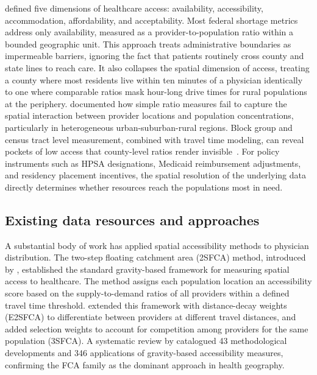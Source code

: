 \documentclass{CUP-JNL-DAP}%
\begin{document}
\citet{penchansky1981} defined five dimensions of healthcare access: availability, accessibility, accommodation, affordability, and acceptability. Most federal shortage metrics address only availability, measured as a provider-to-population ratio within a bounded geographic unit. This approach treats administrative boundaries as impermeable barriers, ignoring the fact that patients routinely cross county and state lines to reach care. It also collapses the spatial dimension of access, treating a county where most residents live within ten minutes of a physician identically to one where comparable ratios mask hour-long drive times for rural populations at the periphery. \citet{guagliardo2004} documented how simple ratio measures fail to capture the spatial interaction between provider locations and population concentrations, particularly in heterogeneous urban-suburban-rural regions. Block group and census tract level measurement, combined with travel time modeling, can reveal pockets of low access that county-level ratios render invisible~\citep{xia2019}. For policy instruments such as HPSA designations, Medicaid reimbursement adjustments, and residency placement incentives, the spatial resolution of the underlying data directly determines whether resources reach the populations most in need.

\subsection{Existing data resources and approaches}

A substantial body of work has applied spatial accessibility methods to physician distribution. The two-step floating catchment area (2SFCA) method, introduced by \citet{luo2003}, established the standard gravity-based framework for measuring spatial access to healthcare. The method assigns each population location an accessibility score based on the supply-to-demand ratios of all providers within a defined travel time threshold. \citet{luo2009} extended this framework with distance-decay weights (E2SFCA) to differentiate between providers at different travel distances, and \citet{wan2012} added selection weights to account for competition among providers for the same population (3SFCA). A systematic review by \citet{saxena2023} catalogued 43 methodological developments and 346 applications of gravity-based accessibility measures, confirming the FCA family as the dominant approach in health geography.
\end{document}
